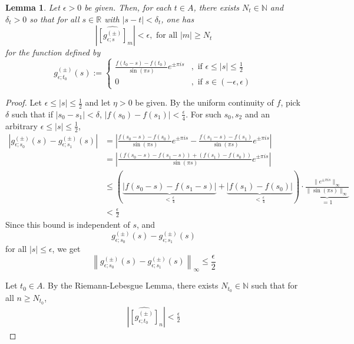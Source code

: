 \documentclass[12pt, reqno]{amsart}
\newtheorem{lemma}[theorem]{Lemma}
\theoremstyle{definition}
\theoremstyle{remark}
\begin{document}
\begin{itemize}
\begin{itemize}
\begin{lemma}
    Let $\epsilon>0$ be given. Then, for each $t\in A$, there exists $N_{t}\in \mathbb{N}$ and $\delta_{t}>0$ so that for all $s\in \mathbb{R}$ with $|s-t|<\delta_{t}$, one has 
    \[
        \left|\widehat{[g_{\epsilon;s}^{(\pm)}]}_{m}\right|<\epsilon,\text{ for all }|m|\ge N_{t}
    \]
    for the function defined by 
    \[
        g^{(\pm)}_{\epsilon;t_{0}}(s):=\begin{cases} \frac{f(t_{0}-s)-f(t_{0})}{\sin(\pi s)}e^{\pm \pi is} & ,\text{ if }\epsilon\le|s|\le \frac{1}{2} \\
            0 & ,\text{ if }s\in(-\epsilon,\epsilon)\end{cases}
    \]
\end{lemma}

\begin{proof}
    Let $\epsilon\le |s|\le \frac{1}{2}$ and let $\eta>0$ be given. By the uniform continuity of $f$, pick $\delta$ such that if $|s_{0}-s_{1}|<\delta$, $|f(s_{0})-f(s_{1})| <\frac{\epsilon}{4}$. For such $s_{0},s_{2}$ and an arbitrary $\epsilon\le |s|\le\frac{1}{2}$,
\begin{align*}
\left|g_{\epsilon;s_{0}}^{(\pm)}(s)-g^{(\pm)}_{\epsilon;s_{1}}(s)\right|&= \left|\frac{f(s_{0}-s)-f(s_{0})}{\sin(\pi s)}e^{\pm \pi is}-\frac{f(s_{1}-s)-f(s_{1})}{\sin(\pi s)}e^{\pm \pi is}\right|\\
&= \left|\frac{(f(s_{0}-s)-f(s_{1}-s))+(f(s_{1})-f(s_{0}))}{\sin(\pi s)}e^{\pm \pi is}\right|\\
&\le (\underbrace{|f(s_{0}-s)-f(s_{1}-s)|}_{< \frac{\epsilon}{4}}+\underbrace{|f(s_{1})-f(s_{0})|}_{< \frac{\epsilon}{4}})\cdot \underbrace{\frac{\|e^{\pm \pi is}\|_{\infty}}{\|\sin(\pi s)\|_{\infty}}}_{=1}\\
&< \frac{\epsilon}{2}
\end{align*}
Since this bound is independent of $s$, and 
\[
    g_{\epsilon;s_{0}}^{(\pm)}(s)-g^{(\pm)}_{\epsilon;s_{1}}(s)
\]
for all $|s|\le \epsilon$, we get
\begin{equation}\label{sup_bound}
\left\|g_{\epsilon;s_{0}}^{(\pm)}(s)-g^{(\pm)}_{\epsilon;s_{1}}(s)\right\|_{\infty}\le \frac{\epsilon}{2}
\end{equation}

Let $t_{0}\in A$. By the Riemann-Lebesgue Lemma, there exists $N_{t_{0}}\in \mathbb{N}$ such that for all $n\ge N_{t_{0}}$,  
\begin{align*}
\left|\widehat{[g_{\epsilon;t_{0}}^{(\pm)}]}_{n}\right|< \frac{\epsilon}{2}
\end{align*}


\end{proof}
\end{itemize}
\end{itemize}
\end{document}
